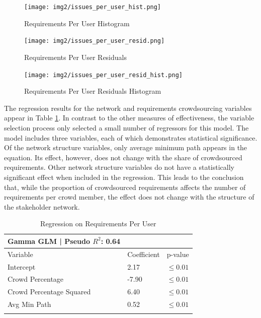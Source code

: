\begin{figure}
  \texttt{[image: img2/issues\_per\_user\_hist.png]}
\caption{Requirements Per User Histogram}
\label{issues_per_user_hist}
\end{figure}

\begin{figure}
  \texttt{[image: img2/issues\_per\_user\_resid.png]}
\caption{Requirements Per User Residuals}
\label{issues_per_user_resid}
\end{figure}

\begin{figure}
  \texttt{[image: img2/issues\_per\_user\_resid\_hist.png]}
\caption{Requirements Per User Residuals Histogram}
\label{issues_per_user_resid_hist}
\end{figure}


The regression results for the network and requirements crowdsourcing variables appear in Table \ref{issues_per_user_regression}. In contrast to the other measures of effectiveness, the variable selection process only selected a small number of regressors for this model. The model includes three variables, each of which demonstrates statistical significance. Of the network structure variables, only average minimum path appears in the equation. Its effect, however, does not change with the share of crowdsourced requirements. Other network structure variables do not have a statistically significant effect when included in the regression.  This leads to the conclusion that, while the proportion of crowdsourced requirements affects the number of requirements per crowd member, the effect does not change with the structure of the stakeholder network. 


\begin{table}
\caption{Regression on Requirements Per User}
\label{issues_per_user_regression}
\begin{tabular}{lll}
Gamma GLM | Pseudo $R^2$: 0.64 \\
\hline\noalign{\smallskip}
Variable & Coefficient & p-value  \\
\noalign{\smallskip}\hline\noalign{\smallskip}
Intercept & 2.17 & $\leq 0.01$ \\
Crowd Percentage & -7.90 & $\leq 0.01$ \\
Crowd Percentage Squared & 6.40 & $\leq 0.01$  \\
Avg Min Path & 0.52 & $\leq 0.01$  \\
\noalign{\smallskip}\hline
\end{tabular}
\end{table}

